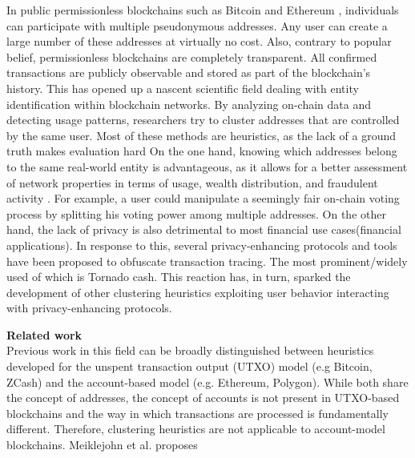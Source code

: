\documentclass[12pt,a4paper,titlepage,oneside,english]{article}
\begin{document}
In public permissionless blockchains such as Bitcoin \citep{nakamotoBitcoin2008} and Ethereum \citep{buterin2014ethereum}, individuals can participate with multiple pseudonymous addresses. Any user can create a large number of these addresses at virtually no cost. Also, contrary to popular belief, permissionless blockchains are completely transparent. All confirmed transactions are publicly observable and stored as part of the blockchain’s history. 
This has opened up a nascent scientific field dealing with entity identification within blockchain networks. By analyzing on-chain data and detecting usage patterns, researchers try to cluster addresses that are controlled by the same user. Most of these methods are heuristics, as the lack of a ground truth makes evaluation hard \newline
On the one hand, knowing which addresses belong to the same real-world entity is advantageous, as it allows for a better assessment of network properties in terms of usage, wealth distribution, and fraudulent activity \citep{FV:17}. For example, a user could manipulate a seemingly fair on-chain voting process by splitting his voting power among multiple addresses. \newline
On the other hand, the lack of privacy is also detrimental to most financial use cases(financial applications). In response to this, several privacy-enhancing protocols and tools have been proposed to obfuscate transaction tracing. The most prominent/widely used of which is Tornado cash. This reaction has, in turn, sparked the development of other clustering heuristics exploiting user behavior interacting with privacy-enhancing protocols. \newline



\textbf{Related work}\\
Previous work in this field can be broadly distinguished between heuristics developed for the unspent transaction output (UTXO) model (e.g Bitcoin, ZCash) and the account-based model (e.g. Ethereum, Polygon). While both share the concept of addresses, the concept of accounts is not present in UTXO-based blockchains and the way in which transactions are processed is fundamentally different. Therefore, clustering heuristics are not applicable to account-model blockchains. Meiklejohn et al. proposes 
\end{document}
